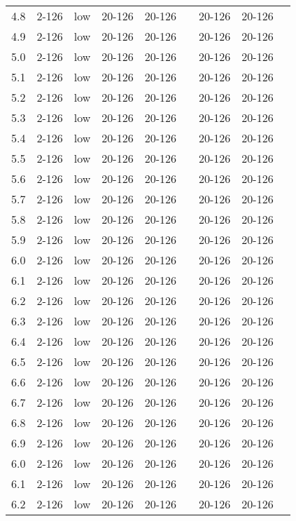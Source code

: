 \documentclass{article}
\begin{document}
\begin{center}
\begin{tabular}{| c | c | c | c | c | c | c | c | c |}
      4.8 & 2-126 & low & 20-126 & 20-126 &  & 20-126 & 20-126 &\\
      4.9 & 2-126 & low & 20-126 & 20-126 &  & 20-126 & 20-126 &\\
      5.0 & 2-126 & low & 20-126 & 20-126 &  & 20-126 & 20-126 &\\
      5.1 & 2-126 & low & 20-126 & 20-126 &  & 20-126 & 20-126 &\\
      5.2 & 2-126 & low & 20-126 & 20-126 &  & 20-126 & 20-126 &\\
      5.3 & 2-126 & low & 20-126 & 20-126 &  & 20-126 & 20-126 &\\
      5.4 & 2-126 & low & 20-126 & 20-126 &  & 20-126 & 20-126 &\\
      5.5 & 2-126 & low & 20-126 & 20-126 &  & 20-126 & 20-126 &\\
      5.6 & 2-126 & low & 20-126 & 20-126 &  & 20-126 & 20-126 &\\
      5.7 & 2-126 & low & 20-126 & 20-126 &  & 20-126 & 20-126 &\\
      5.8 & 2-126 & low & 20-126 & 20-126 &  & 20-126 & 20-126 &\\
      5.9 & 2-126 & low & 20-126 & 20-126 &  & 20-126 & 20-126 &\\
      6.0 & 2-126 & low & 20-126 & 20-126 &  & 20-126 & 20-126 &\\
      6.1 & 2-126 & low & 20-126 & 20-126 &  & 20-126 & 20-126 &\\
      6.2 & 2-126 & low & 20-126 & 20-126 &  & 20-126 & 20-126 &\\
      6.3 & 2-126 & low & 20-126 & 20-126 &  & 20-126 & 20-126 &\\
      6.4 & 2-126 & low & 20-126 & 20-126 &  & 20-126 & 20-126 &\\
      6.5 & 2-126 & low & 20-126 & 20-126 &  & 20-126 & 20-126 &\\
      6.6 & 2-126 & low & 20-126 & 20-126 &  & 20-126 & 20-126 &\\
      6.7 & 2-126 & low & 20-126 & 20-126 &  & 20-126 & 20-126 &\\
      6.8 & 2-126 & low & 20-126 & 20-126 &  & 20-126 & 20-126 &\\
      6.9 & 2-126 & low & 20-126 & 20-126 &  & 20-126 & 20-126 &\\
      6.0 & 2-126 & low & 20-126 & 20-126 &  & 20-126 & 20-126 &\\
      6.1 & 2-126 & low & 20-126 & 20-126 &  & 20-126 & 20-126 &\\
      6.2 & 2-126 & low & 20-126 & 20-126 &  & 20-126 & 20-126 &\\

\end{tabular}
\end{center}
\end{document}
